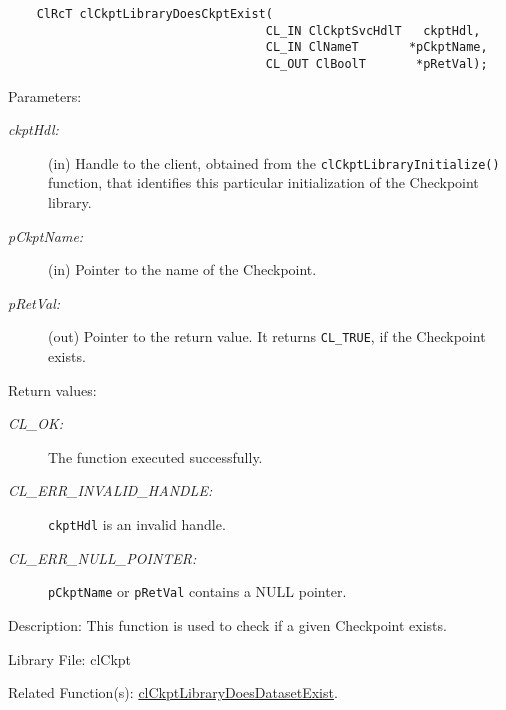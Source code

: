 \begin{flushleft}
\begin{Desc}
\footnotesize\begin{verbatim}    ClRcT clCkptLibraryDoesCkptExist(
                                	CL_IN ClCkptSvcHdlT   ckptHdl,
                                	CL_IN ClNameT       *pCkptName,
                                	CL_OUT ClBoolT       *pRetVal);
\end{verbatim}
\normalsize
\end{Desc}
\begin{Desc}
\item[Parameters:]
\begin{description}
\item[{\em ckpt\-Hdl:}](in) Handle to the client, obtained from the {\tt{clCkptLibraryInitialize()}} function, that identifies this particular 
initialization of the Checkpoint library. 
\item[{\em p\-Ckpt\-Name:}](in) Pointer to the name of the Checkpoint. 
\item[{\em p\-Ret\-Val:}](out) Pointer to the return value. It returns {\tt{CL\_\-TRUE}}, if the Checkpoint exists.
\end{description}
\end{Desc}
\begin{Desc}
\item[Return values:]
\begin{description}
\item[{\em CL\_\-OK:}]The function executed successfully. 
\item[{\em CL\_\-ERR\_\-INVALID\_\-HANDLE:}]{\tt{ckptHdl}} is an invalid handle.
\item[{\em CL\_\-ERR\_\-NULL\_\-POINTER:}]{\tt{pCkptName}} or {\tt{pRetVal}} contains a NULL pointer.\end{description}
\end{Desc}
\begin{Desc}
\item[Description:]This function is used to check if a given Checkpoint exists.\end{Desc}
\begin{Desc}
\item[Library File:]cl\-Ckpt\end{Desc}
\begin{Desc}
\item[Related Function(s):]\hyperlink{pageckpt209}{cl\-Ckpt\-Library\-Does\-Dataset\-Exist}. \end{Desc}
\newpage








\end{flushleft}
